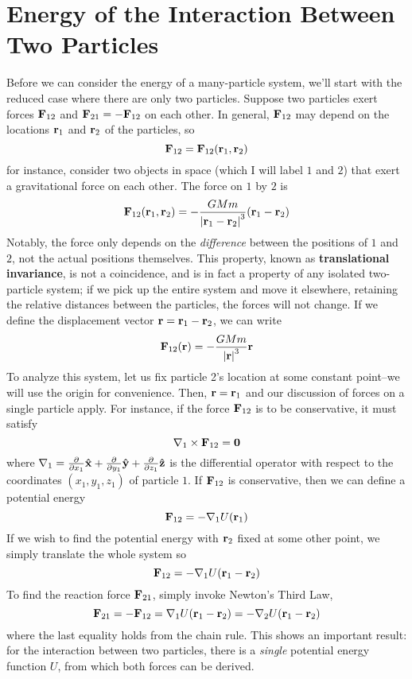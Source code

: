 \section{Energy of the Interaction Between Two Particles}
Before we can consider the energy of a many-particle system, we'll start with the reduced case where there are only two particles. Suppose two particles exert forces $\mathbf{F}_{12}$ and $\mathbf{F}_{21} = -\mathbf{F}_{12}$ on each other. In general, $\mathbf{F}_{12}$ may depend on the locations $\mathbf{r}_1$ and $\mathbf{r}_2$ of the particles, so
\[ \mathbf{F}_{12} = \mathbf{F}_{12}(\mathbf{r}_1, \mathbf{r}_2) \]
for instance, consider two objects in space (which I will label $1$ and $2$) that exert a gravitational force on each other. The force on $1$ by $2$ is
\[ \mathbf{F}_{12}(\mathbf{r}_1, \mathbf{r}_2) = -\frac{GMm}{\abs{\mathbf{r}_1-\mathbf{r}_2}^3}(\mathbf{r}_1-\mathbf{r}_2) \]
Notably, the force only depends on the \textit{difference} between the positions of $1$ and $2$, not the actual positions themselves. This property, known as \textbf{translational invariance}, is not a coincidence, and is in fact a property of any isolated two-particle system; if we pick up the entire system and move it elsewhere, retaining the relative distances between the particles, the forces will not change. If we define the displacement vector $\mathbf{r} = \mathbf{r}_1 - \mathbf{r}_2$, we can write
\[ \mathbf{F}_{12}(\mathbf{r}) = -\frac{GMm}{\abs{\mathbf{r}}^3}\mathbf{r}\]
To analyze this system, let us fix particle 2's location at some constant point--we will use the origin for convenience. Then, $\mathbf{r} = \mathbf{r}_1$ and our discussion of forces on a single particle apply. For instance, if the force $\mathbf{F}_{12}$ is to be conservative, it must satisfy
\[ \nabla_1 \times \mathbf{F}_{12} = \mathbf{0}\]
where $\nabla_1 = \pdv{x_1} \mathbf{\hat{x}} + \pdv{y_1}\mathbf{\hat{y}} + \pdv{z_1}\mathbf{\hat{z}}$ is the differential operator with respect to the coordinates $(x_1, y_1, z_1)$ of particle $1$. If $\mathbf{F}_{12}$ is conservative, then we can define a potential energy
\[ \mathbf{F}_{12} = -\nabla_1 U(\mathbf{r}_1) \]
If we wish to find the potential energy with $\mathbf{r}_2$ fixed at some other point, we simply translate the whole system so
\[ \mathbf{F}_{12} = -\nabla_1 U(\mathbf{r}_1 - \mathbf{r}_2) \]
To find the reaction force $\mathbf{F}_{21}$, simply invoke Newton's Third Law,
\[ \mathbf{F}_{21} = -\mathbf{F}_{12} = \nabla_1U(\mathbf{r}_1-\mathbf{r}_2) = -\nabla_2 U(\mathbf{r}_1-\mathbf{r}_2) \]
where the last equality holds from the chain rule. This shows an important result: for the interaction between two particles, there is a \textit{single} potential energy function $U$, from which both forces can be derived. 

